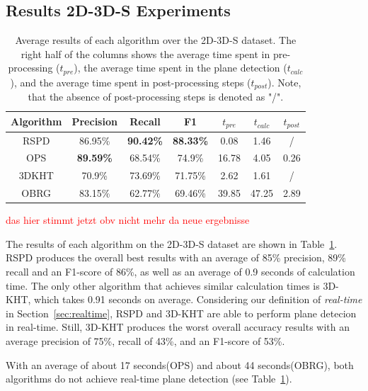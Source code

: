 \documentclass[main.tex]{subfiles}
\begin{document}
\subsection{Results 2D-3D-S Experiments}

\begin{table}[H]
    \centering
    \begin{tabular}{c|cccccc}
        Algorithm & Precision        & Recall           & F1               & $t_{pre}$ & $t_{calc}$ & $t_{post}$ \\ \hline
        RSPD      & 86.95\%          & \textbf{90.42\%} & \textbf{88.33\%} & 0.08      & 1.46       & /          \\
        OPS       & \textbf{89.59\%} & 68.54\%          & 74.9\%           & 16.78     & 4.05       & 0.26       \\
        3DKHT     & 70.9\%           & 73.69\%          & 71.75\%          & 2.62      & 1.61       & /          \\
        OBRG      & 83.15\%          & 62.77\%          & 69.46\%          & 39.85     & 47.25      & 2.89
    \end{tabular}
    \caption[Overall 2D-3D-S Results]{Average results of each algorithm over the 2D-3D-S dataset. The right half of the columns shows the average time spent in
        pre-processing ($t_{pre}$), the average time spent in the plane detection ($t_{calc}$), and the average time spent in post-processing steps ($t_{post}$).
        Note, that the absence of post-processing steps is denoted as "/".}
    \label{tab:res-3d2ds-total}
\end{table}

\textcolor{red}{das hier stimmt jetzt obv nicht mehr da neue ergebnisse}

The results of each algorithm on the 2D-3D-S dataset are shown in Table~\ref{tab:res-3d2ds-total}.
RSPD produces the overall best results with an average of 85\% precision, 89\% recall and an F1-score of 86\%, as well as an average of 0.9 seconds of calculation time.
The only other algorithm that achieves similar calculation times is 3D-KHT, which takes 0.91 seconds on average. Considering our definition of \textit{real-time} in Section~\ref{sec:realtime},
RSPD and 3D-KHT are able to perform plane detecion in real-time. Still, 3D-KHT produces the worst overall accuracy results with an average precision of 75\%, recall of 43\%, and an F1-score of 53\%.

With an average of about 17 seconds(OPS) and about 44 seconds(OBRG), both algorithms do not achieve real-time plane detection (see Table~\ref{tab:res-3d2ds-total}).
\end{document}
